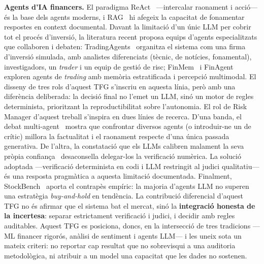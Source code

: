\documentclass[10pt,twocolumn,a4paper]{article}
\begin{document}
\textbf{Agents d'IA financers.} El paradigma ReAct~\cite{yao2023react} ---intercalar
raonament i acció--- és la base dels agents moderns, i RAG~\cite{lewis2020} hi
afegeix la capacitat de fonamentar respostes en context documental. Davant la
limitació d'un únic LLM per cobrir tot el procés d'inversió, la literatura recent
proposa equips d'agents especialitzats que col\textperiodcentered{}laboren i debaten:
TradingAgents~\cite{xiao2024tradingagents} organitza el sistema com una firma
d'inversió simulada, amb analistes diferenciats (tècnic, de notícies, fonamental),
investigadors, un \textit{trader} i un equip de gestió de risc;
FinMem~\cite{yu2023finmem} i FinAgent~\cite{zhang2024finagent} exploren agents de
\textit{trading} amb memòria estratificada i percepció multimodal. El disseny de
tres rols d'aquest TFG s'inscriu en aquesta línia, però amb una diferència
deliberada: la decisió final no l'emet un LLM, sinó un motor de regles determinista,
prioritzant la reproductibilitat sobre l'autonomia. El rol de Risk Manager
d'aquest treball s'inspira en dues línies de recerca. D'una banda, el debat
multi-agent~\cite{du2023debate} mostra que confrontar diversos agents (o introduir-ne
un de crític) millora la factualitat i el raonament respecte d'una única passada
generativa. De l'altra, la constatació que els LLMs calibren malament la seva pròpia
confiança~\cite{xiong2024} desaconsella delegar-los la verificació numèrica. La
solució adoptada ---verificació determinista en codi i LLM restringit al judici
qualitatiu--- és una resposta pragmàtica a aquesta limitació documentada. Finalment,
StockBench~\cite{stockbench2025} aporta el contrapès empíric: la majoria d'agents
LLM no superen una estratègia \textit{buy-and-hold} en tendència. La contribució
diferencial d'aquest TFG no és afirmar que el sistema bat el mercat, sinó la
\textbf{integració honesta de la incertesa}: separar estrictament verificació i
judici, i decidir amb regles auditables. Aquest TFG es posiciona, doncs, en la
intersecció de tres tradicions ---ML financer rigorós, anàlisi de sentiment i agents
LLM--- i les uneix sota un mateix criteri: no reportar cap resultat que no
sobrevisqui a una auditoria metodològica, ni atribuir a un model una capacitat que
les dades no sostenen.

\end{document}
